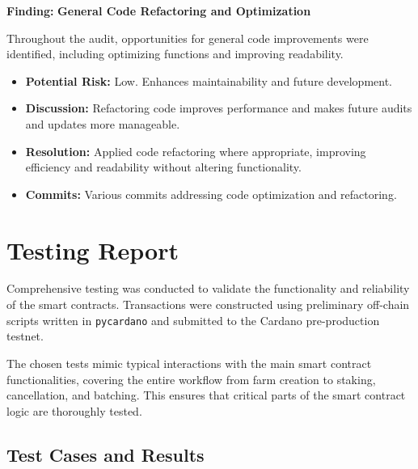 \documentclass{article}
\begin{document}
\begin{minorbox}
\textbf{Finding:} \textbf{General Code Refactoring and Optimization}

Throughout the audit, opportunities for general code improvements were identified, including optimizing functions and improving readability.

\begin{itemize}[label=$\diamond$]
    \item \textbf{Potential Risk:} Low. Enhances maintainability and future development.
    \item \textbf{Discussion:} Refactoring code improves performance and makes future audits and updates more manageable.
    \item \textbf{Resolution:} Applied code refactoring where appropriate, improving efficiency and readability without altering functionality.
    \item \textbf{Commits:} Various commits addressing code optimization and refactoring.
\end{itemize}
\end{minorbox}

\section{Testing Report}

Comprehensive testing was conducted to validate the functionality and reliability of the smart contracts. Transactions were constructed using preliminary off-chain scripts written in \texttt{pycardano} and submitted to the Cardano pre-production testnet.

The chosen tests mimic typical interactions with the main smart contract functionalities, covering the entire workflow from farm creation to staking, cancellation, and batching. This ensures that critical parts of the smart contract logic are thoroughly tested.

\subsection{Test Cases and Results}
\end{document}
